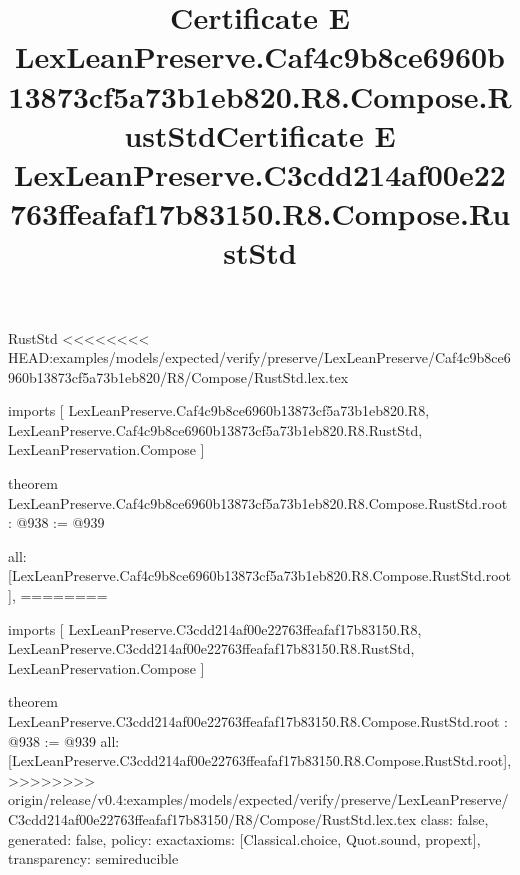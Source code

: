 \begin{lexlean}{RustStd}
<<<<<<<< HEAD:examples/models/expected/verify/preserve/LexLeanPreserve/Caf4c9b8ce6960b13873cf5a73b1eb820/R8/Compose/RustStd.lex.tex
\title{Certificate E LexLeanPreserve.Caf4c9b8ce6960b13873cf5a73b1eb820.R8.Compose.RustStd}
\begin{coremodule}
imports [
  LexLeanPreserve.Caf4c9b8ce6960b13873cf5a73b1eb820.R8,
  LexLeanPreserve.Caf4c9b8ce6960b13873cf5a73b1eb820.R8.RustStd,
  LexLeanPreservation.Compose
]

theorem LexLeanPreserve.Caf4c9b8ce6960b13873cf5a73b1eb820.R8.Compose.RustStd.root : @938 := @939 {
  all: [LexLeanPreserve.Caf4c9b8ce6960b13873cf5a73b1eb820.R8.Compose.RustStd.root],
========
\title{Certificate E LexLeanPreserve.C3cdd214af00e22763ffeafaf17b83150.R8.Compose.RustStd}
\begin{coremodule}
imports [
  LexLeanPreserve.C3cdd214af00e22763ffeafaf17b83150.R8,
  LexLeanPreserve.C3cdd214af00e22763ffeafaf17b83150.R8.RustStd,
  LexLeanPreservation.Compose
]

theorem LexLeanPreserve.C3cdd214af00e22763ffeafaf17b83150.R8.Compose.RustStd.root : @938 := @939 {
  all: [LexLeanPreserve.C3cdd214af00e22763ffeafaf17b83150.R8.Compose.RustStd.root],
>>>>>>>> origin/release/v0.4:examples/models/expected/verify/preserve/LexLeanPreserve/C3cdd214af00e22763ffeafaf17b83150/R8/Compose/RustStd.lex.tex
  class: false,
  generated: false,
  policy: exact{axioms: [Classical.choice, Quot.sound, propext]},
  transparency: semireducible
}


\end{coremodule}}
\end{coremodule}
\end{lexlean}
